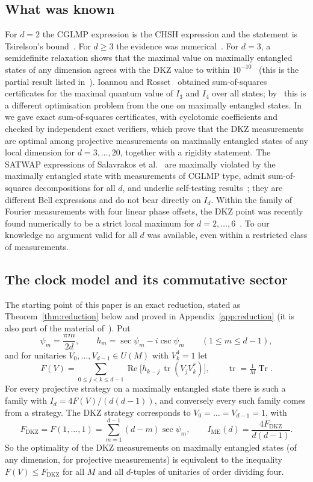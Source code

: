 \documentclass[11pt]{amsart}
\theoremstyle{definition}
\theoremstyle{remark}
\newcommand{\tr}{\operatorname{tr}}
\newcommand{\Tr}{\operatorname{Tr}}
\renewcommand{\Re}{\operatorname{Re}}
\newcommand{\FD}{F_{\mathrm{DKZ}}}
\newcommand{\IME}{I_{\mathrm{ME}}}
\begin{document}
\subsection{What was known}
For $d=2$ the CGLMP expression is the CHSH expression and the statement is Tsirelson's bound~\cite{Tsirelson}.
For $d\ge 3$ the evidence was numerical~\cite{KGZMZ,DKZ,CGLMP}. For $d=3$, a semidefinite relaxation shows
that the maximal value on maximally entangled states of any dimension agrees with the DKZ value to within
$10^{-10}$~\cite{LVN} (this is the partial result listed in~\cite{OQP}). Ioannou and Rosset~\cite{IR} obtained
sum-of-squares certificates for the maximal quantum value of $I_3$ and $I_4$ over all states; by~\cite{ADGL} this
is a different optimisation problem from the one on maximally entangled states. In~\cite{repo} we gave exact
sum-of-squares certificates, with cyclotomic coefficients and checked by independent exact verifiers, which prove
that the DKZ measurements are optimal among projective measurements on maximally entangled states of any local
dimension for $d=3,\dots,20$, together with a rigidity statement. The
SATWAP expressions of Salavrakos et al.~\cite{SATWAP} are maximally violated by the maximally entangled state
with measurements of CGLMP type, admit sum-of-squares decompositions for all $d$, and underlie self-testing
results~\cite{KSTBSA,SSKA}; they are different Bell expressions and do not bear directly on $I_d$. Within the
family of Fourier measurements with four linear phase offsets, the DKZ point was recently found numerically to be
a strict local maximum for $d=2,\dots,6$~\cite[Sec.~V]{TMMD}. To our knowledge no argument valid for all $d$ was
available, even within a restricted class of measurements.

\subsection{The clock model and its commutative sector}
The starting point of this paper is an exact reduction, stated as Theorem~\ref{thm:reduction} below and proved
in Appendix~\ref{app:reduction} (it is also part of the material of~\cite{repo}). Put
\[
\psi_m=\frac{\pi m}{2d},\qquad h_m=\sec\psi_m-i\csc\psi_m\qquad(1\le m\le d-1),
\]
and for unitaries $V_0,\dots,V_{d-1}\in U(M)$ with $V_k^4=1$ let
\begin{equation}\label{eq:F}
F(V)=\sum_{0\le j<k\le d-1}\Re\bigl[h_{k-j}\,\tr(V_jV_k^*)\bigr],\qquad \tr=\tfrac1M\Tr .
\end{equation}
For every projective strategy on a maximally entangled state there is such a family with
$I_d=4F(V)/(d(d-1))$, and conversely every such family comes from a strategy. The DKZ strategy corresponds to
$V_0=\dots=V_{d-1}=1$, with
\begin{equation}\label{eq:FDKZ}
\FD=F(1,\dots,1)=\sum_{m=1}^{d-1}(d-m)\sec\psi_m,\qquad \IME(d)=\frac{4\FD}{d(d-1)} .
\end{equation}
So the optimality of the DKZ measurements on maximally entangled states (of any dimension, for projective
measurements) is equivalent to the inequality $F(V)\le\FD$ for all $M$ and all $d$-tuples of unitaries of order
dividing four.
\end{document}
